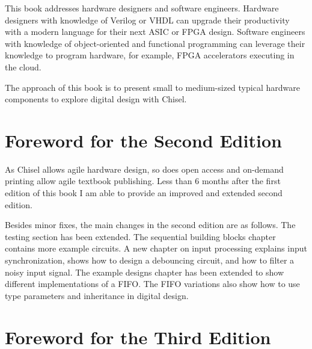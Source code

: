 \documentclass[%
    10pt,
    headinclude, footexclude,
    openright, %
    notitlepage,
    cleardoubleempty,
    headsepline,
    pointlessnumbers,
    bibtotoc, idxtotoc,
    ]{scrbook}
\begin{document}
This book addresses hardware designers and software engineers. Hardware designers with knowledge of Verilog or VHDL can upgrade their productivity with a modern language for their next ASIC or FPGA design. Software engineers with knowledge of object-oriented and functional programming can leverage their knowledge to program hardware, for example, FPGA accelerators executing in the cloud.

The approach of this book is to present small to medium-sized typical hardware components to explore digital design with Chisel.




\section*{Foreword for the Second Edition}

As Chisel allows agile hardware design, so does open access and on-demand printing
allow agile textbook publishing. Less than 6 months after the first edition of this book
I am able to provide an improved and extended second edition.

Besides minor fixes, the main changes in the second edition are as follows.
The testing section has been extended. The sequential building blocks chapter contains
more example circuits. A new chapter on input processing explains input synchronization,
shows how to design a debouncing circuit, and how to filter a noisy input signal.
The example designs chapter has been extended to show different implementations of a FIFO.
The FIFO variations also show how to use type parameters and inheritance in digital design.

\section*{Foreword for the Third Edition}
\end{document}
